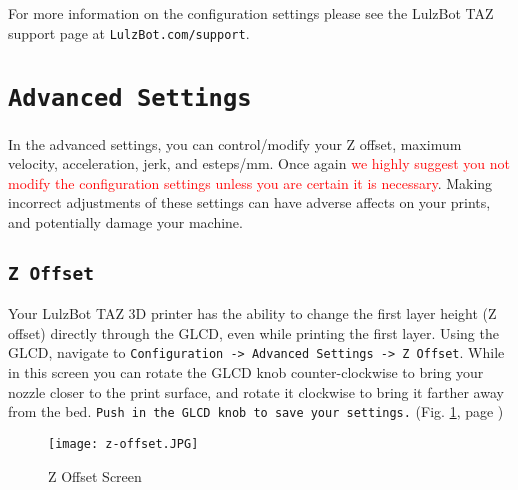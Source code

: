 For more information on the configuration settings please see the LulzBot TAZ support page at \texttt{LulzBot.com/support}.

\section{\texttt{Advanced Settings}}
In the advanced settings, you can control/modify your Z offset, maximum velocity, acceleration, jerk, and esteps/mm. Once again \textcolor{red}{we highly suggest you not modify the configuration settings unless you are certain it is necessary}. Making incorrect adjustments of these settings can have adverse affects on your prints, and potentially damage your machine.

\subsection{\texttt{Z Offset}} 
\label{sssec:Z Offset}
Your LulzBot TAZ 3D printer has the ability to change the first layer height (Z offset) directly through the GLCD, even while printing the first layer. Using the GLCD, navigate to \texttt{Configuration -> Advanced Settings -> Z Offset}. While in this screen you can rotate the GLCD knob counter-clockwise to bring your nozzle closer to the print surface, and rotate it clockwise to bring it farther away from the bed. \texttt{Push in the GLCD knob to save your settings.} (Fig. \ref{fig:Z_offset_screen}, page \pageref{fig:Z_offset_screen})

\begin{figure}[H]
\centering
\texttt{[image: z-offset.JPG]}
\caption{Z Offset Screen}
\label{fig:Z_offset_screen}
\end{figure}



